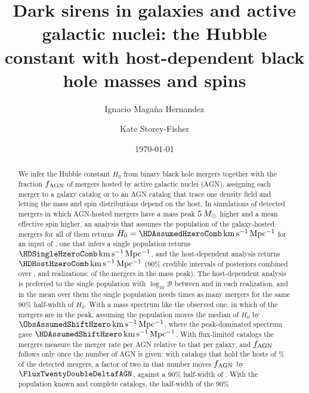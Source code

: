 \documentclass[aps,prd,reprint,twocolumn,superscriptaddress,nofootinbib,floatfix,nolongbibliography]{revtex4-2}
\newcommand{\msun}{\,M_\odot}
\newcommand{\kms}{{\rm km\,s^{-1}\,Mpc^{-1}}}
\newcommand{\fagn}{f_{\rm AGN}}
\newcommand{\lB}{\log_{10}\mathcal{B}}
\begin{document}
\title{Dark sirens in galaxies and active galactic nuclei: the Hubble constant
with host-dependent black hole masses and spins}

\author{Ignacio Maga\~na Hernandez}
\author{Kate Storey-Fisher}

\date{\today}

\begin{abstract}
We infer the Hubble constant $H_0$ from binary black hole mergers together
with the fraction $\fagn$ of mergers hosted by active galactic nuclei (AGN),
assigning each merger to a galaxy catalog or to an AGN catalog that trace one
density field and letting the mass and spin distributions depend on the host.
In simulations of \MockNev{} detected mergers in which AGN-hosted mergers have
a mass peak $\MockDmuG\msun$ higher and a mean effective spin \MockDmuChi{}
higher, an analysis that assumes the population of the galaxy-hosted mergers
for all of them returns $H_0=\HDAssumedHzeroComb\,\kms$ for an input of
\MockHzero, one that infers a single population returns
$\HDSingleHzeroComb\,\kms$, and the host-dependent analysis returns
$\HDHostHzeroComb\,\kms$ (90\% credible intervals of posteriors combined over
\NrealHDAssumed, \NrealHDSingle{} and \NrealHD{} realizations; \MockPeakFrac{}
of the mergers in the mass peak).
The host-dependent analysis is preferred to the single population with
$\lB$ between \HDLBMin{} and \HDLBMax{} in each realization, and in the mean
over them the single population needs \CostSingleHost{} times as many mergers
for the same 90\% half-width of $H_0$.
With a mass spectrum like the observed one, in which \ObsPeakFrac{} of the
mergers are in the peak, assuming the population moves the median of $H_0$
by $\ObsAssumedShiftHzero\,\kms$, where the peak-dominated spectrum gave
$\HDAssumedShiftHzero\,\kms$.
With flux-limited catalogs the mergers measure the merger rate per AGN
relative to that per galaxy, and $\fagn$ follows only once the number of AGN
is given: with catalogs that hold the hosts of \MockEventCompTwenty\% of
the detected mergers, a factor of two in that number moves $\fagn$ by
$\FluxTwentyDoubleDeltafAGN$, against a 90\% half-width of
\FluxTwentyfAGNHalfWid.
With the population known and complete catalogs, the half-width of the 90\%

\end{abstract}
\end{document}
